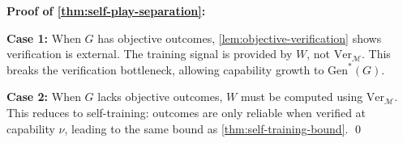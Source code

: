 \documentclass{article}
\theoremstyle{definition}
\theoremstyle{remark}
\newcommand{\M}{\mathcal{M}}  %
\newcommand{\Gen}{\text{Gen}}  %
\newcommand{\Ver}{\text{Ver}}  %
\begin{document}
\noindent\textbf{Proof of \cref{thm:self-play-separation}:}

\textbf{Case 1:} When \(G\) has objective outcomes, \cref{lem:objective-verification} shows verification is external. The training signal is provided by \(W\), not \(\Ver_\M\). This breaks the verification bottleneck, allowing capability growth to \(\Gen^*(G)\).

\textbf{Case 2:} When \(G\) lacks objective outcomes, \(W\) must be computed using \(\Ver_\M\). This reduces to self-training: outcomes are only reliable when verified at capability \(\nu\), leading to the same bound as \cref{thm:self-training-bound}. \qed
\end{document}
